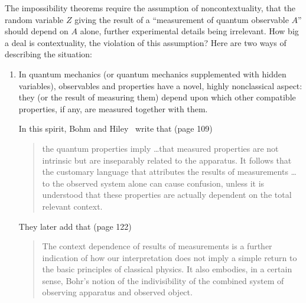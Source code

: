 \documentclass[12pt]{article}
\begin{document}
The impossibility theorems require the assumption of noncontextuality,
that the random variable $Z$ giving the result of a ``measurement of
quantum observable $A$'' should depend on $A$ alone, further
experimental details being irrelevant. How big a deal is
contextuality, the violation of this assumption? Here are two ways of
describing the situation:
\begin{enumerate}
\item In quantum mechanics (or quantum mechanics supplemented with
   hidden variables), observables and properties have a novel, highly
   nonclassical aspect: they (or the result of measuring them) depend
   upon which other compatible properties, if any, are measured
   together with them.

   In this spirit, Bohm and Hiley~\cite{bohi} write that (page 109)
\begin{quotation}\small\noindent
   the quantum properties imply \dots that measured properties are not
   intrinsic but are inseparably related to the apparatus. It follows
   that the customary language that attributes the results of
   measurements \dots to the observed system alone can cause confusion,
   unless it is understood that these properties are actually dependent
   on the total relevant context.
\end{quotation}
They later add that (page 122)
\begin{quotation}\small\noindent
   The context dependence of results of measurements is a further
   indication of how our interpretation does not imply a simple return
   to the basic principles of classical physics. It also embodies, in a
   certain sense, Bohr's notion of the indivisibility of the combined
   system of observing apparatus and observed object.
\end{quotation}
\smallskip


\end{enumerate}
\end{document}
